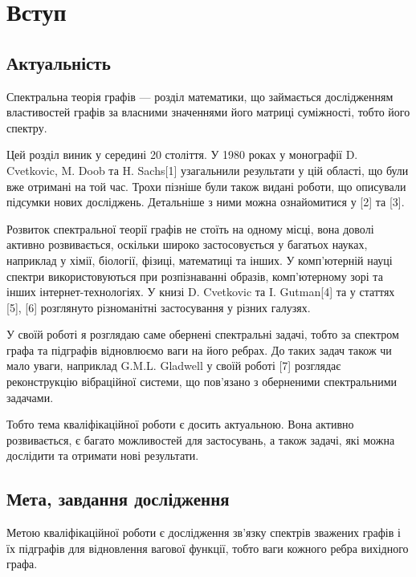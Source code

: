 \setcounter{secnumdepth}{2}
\section{Вступ}
\subsection{Актуальність}
Спектральна теорія графів --- розділ математики, що займається дослідженням властивостей графів за власними значеннями його матриці суміжності, тобто його спектру.

Цей розділ виник у середині 20 століття. У 1980 роках у монографії D. Cvetkovic, M. Doob та H. Sachs[1] узагальнили результати у цій області, що були вже отримані на той час. Трохи пізніше були також видані роботи, що описували підсумки нових досліджень. Детальніше з ними можна ознайомитися у [2] та [3].

Розвиток спектральної теорії графів не стоїть на одному місці, вона доволі активно розвивається, оскільки широко застосовується у багатьох науках, наприклад у хімії, біології, фізиці, математиці та інших. У комп’ютерній науці спектри використовуються при розпізнаванні образів, комп’ютерному зорі та інших інтернет-технологіях. У книзі D. Cvetkovic та I. Gutman[4] та у статтях [5], [6] розглянуто різноманітні застосування у різних галузях.

У своїй роботі я розглядаю саме обернені спектральні задачі, тобто за спектром графа та підграфів відновлюємо ваги на його ребрах. До таких задач також чи мало уваги, наприклад G.M.L. Gladwell у своїй роботі [7] розглядає реконструкцію вібраційної системи, що пов’язано з оберненими спектральними задачами.

Тобто тема кваліфікаційної роботи є досить актуальною. Вона активно розвивається, є багато можливостей для застосувань, а також задачі, які  можна дослідити та отримати нові результати.

\subsection{Мета, завдання дослідження}
Метою кваліфікаційної роботи є дослідження зв’язку спектрів зважених графів і їх підграфів для відновлення вагової функції, тобто ваги кожного ребра вихідного графа.

